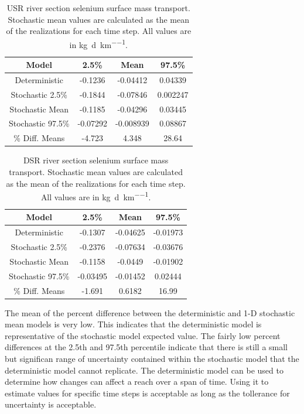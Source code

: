 \begin{linenumbers}
\begin{table}[htbp]
\centering
\caption[USR river section selenium surface mass transport.]{USR river section selenium surface mass transport.  Stochastic mean values are calculated as the mean of the realizations for each time step. All values are in \si{\kilo\gram\per\day\per\kilo\meter}.}
\label{tab:USRSeFlow}
\begin{tabular}{c|ccc}
	\toprule
	Model& 2.5\% & Mean & 97.5\% \\
	\midrule
	\midrule
	Deterministic    &	-0.1236&	-0.04412&	0.04339\\
	\midrule                                           
	Stochastic 2.5\% &	-0.1844&	-0.07846&	0.002247\\
	Stochastic Mean  &	-0.1185&	-0.04296&	0.03445\\ 
	Stochastic 97.5\%&	-0.07292&	-0.008939&	0.08867\\ 
	\midrule                                           
	\% Diff. Means&		-4.723&	4.348&	28.64\\
	\bottomrule
\end{tabular}
\end{table}

\begin{table}[htbp]
\centering
\caption[DSR river section selenium surface mass transport.]{DSR river section selenium surface mass transport.  Stochastic mean values are calculated as the mean of the realizations for each time step. All values are in \si{\kilo\gram\per\day\per\kilo\meter}.}
\label{tab:DSRSeFlow}
\begin{tabular}{c|ccc}
	\toprule
	Model& 2.5\% & Mean & 97.5\% \\
	\midrule
	\midrule
	Deterministic    &	-0.1307	&-0.04625	&-0.01973  \\
	\midrule                                           
	Stochastic 2.5\% &	-0.2376&	-0.07634&	-0.03676\\
	Stochastic Mean  &	-0.1158&	-0.0449&	-0.01902\\
	Stochastic 97.5\%&	-0.03495&	-0.01452&	0.02444\\ 
	\midrule                                           
	\% Diff. Means&		-1.691&	0.6182&	16.99\\
	\bottomrule
\end{tabular}
\end{table}

The mean of the percent difference between the deterministic and 1-D stochastic mean models is very low.  This indicates that the deterministic model is representative of the stochastic model expected value.  The fairly low percent differences at the 2.5th and 97.5th percentile indicate that there is still a small but significan range of uncertainty contained within the stochastic model that the deterministic model cannot replicate.  The deterministic model can be used to determine how changes can affect a reach over a span of time.  Using it to estimate values for specific time steps is acceptable as long as the tollerance for uncertainty is acceptable.


\end{linenumbers}
